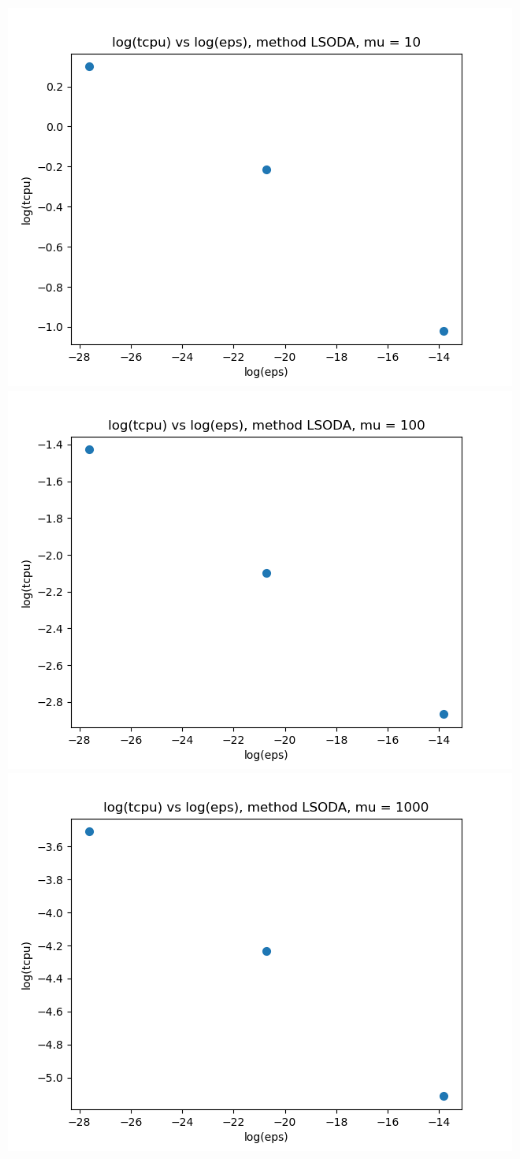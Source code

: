 \documentclass{article}
\begin{document}
\begin{enumerate}
\begin{enumerate}[label=(\alph*)]
\begin{center}
		\includegraphics[scale=.3]{hw2 p1b log(tcpu) vs log(eps), method LSODA, mu = 10}
		\includegraphics[scale=.3]{hw2 p1b log(tcpu) vs log(eps), method LSODA, mu = 100}
		\includegraphics[scale=.3]{hw2 p1b log(tcpu) vs log(eps), method LSODA, mu = 1000}
	\end{center}
	

\end{enumerate}
\end{enumerate}
\end{document}
